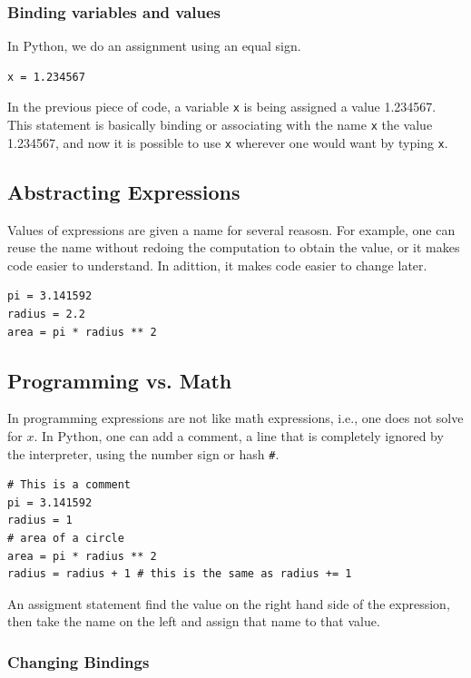 \documentclass[a4paper]{article}
\newcommand{\inlinecode}{\texttt}
\begin{document}
\subsubsection{Binding variables and values}

In Python, we do an assignment using an equal sign.

\begin{lstlisting}
x = 1.234567
\end{lstlisting}

In the previous piece of code, a variable \inlinecode{x} is being assigned
a value 1.234567. This statement is basically binding or associating with the
name \inlinecode{x} the value 1.234567, and now it is possible to use
\inlinecode{x} wherever one would want by typing \inlinecode{x}.

\subsection{Abstracting Expressions}

Values of expressions are given a name for several reasosn. For example, one
can reuse the name without redoing the computation to obtain the value, or
it makes code easier to understand. In adittion, it makes code easier to
change later.

\begin{lstlisting}
pi = 3.141592
radius = 2.2
area = pi * radius ** 2
\end{lstlisting}

\subsection{Programming vs. Math}

In programming expressions are not like math expressions, i.e., one does not
solve for $x$. In Python, one can add a comment, a line that is completely
ignored by the interpreter, using the number sign or hash \inlinecode{\#}.

\begin{lstlisting}
# This is a comment
pi = 3.141592
radius = 1
# area of a circle
area = pi * radius ** 2
radius = radius + 1 # this is the same as radius += 1
\end{lstlisting}

An assigment statement find the value on the right hand side of the expression,
then take the name on the left and assign that name to that value.

\subsubsection{Changing Bindings}
\end{document}
